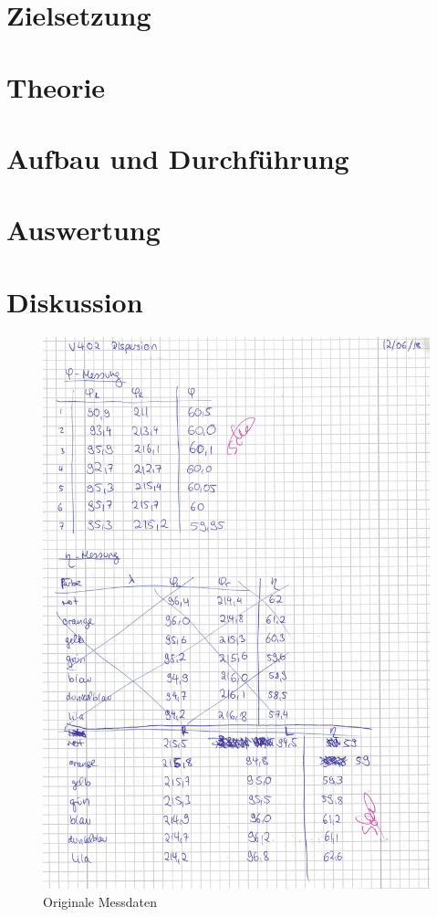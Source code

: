 

\setlength{\parindent}{0em}

%

\newpage

\section{Zielsetzung}



\section{Theorie}

\newpage


\section{Aufbau und Durchführung}

\newpage
\FloatBarrier

\section{Auswertung}

\newpage
\FloatBarrier

\section{Diskussion}



\nocite{*}
\printbibliography

\begin{figure}
  \centering
  \includegraphics[width=\textwidth]{OMD1.pdf}
  \caption{Originale Messdaten}
  \label{OMD}
\end{figure}



